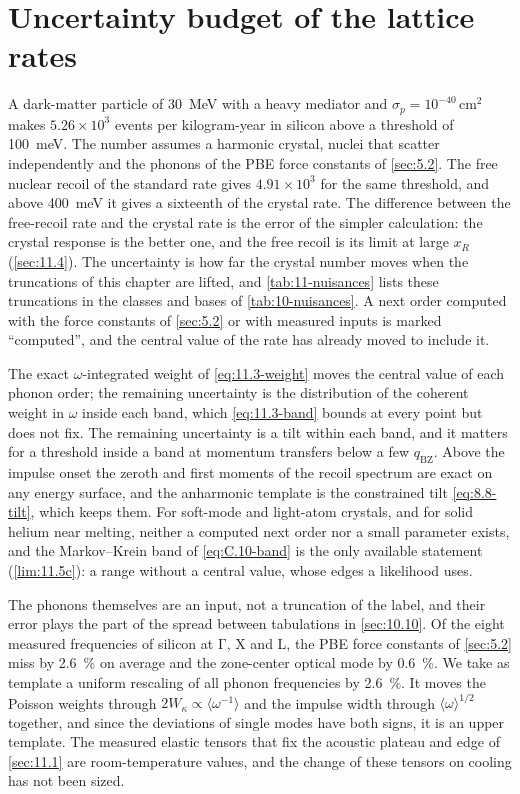 \section{Uncertainty budget of the lattice rates}\label{sec:11.9}

A dark-matter particle of \SI{30}{MeV} with a heavy mediator and $\sigma_p = 10^{-40}\,\mathrm{cm^2}$ makes $5.26\times10^3$ events per kilogram-year in silicon above a threshold of \SI{100}{meV}. The number assumes a harmonic crystal, nuclei that scatter independently and the phonons of the PBE force constants of \cref{sec:5.2}. The free nuclear recoil of the standard rate gives $4.91\times10^3$ for the same threshold, and above \SI{400}{meV} it gives a sixteenth of the crystal rate. The difference between the free-recoil rate and the crystal rate is the error of the simpler calculation: the crystal response is the better one, and the free recoil is its limit at large $x_R$ (\cref{sec:11.4}). The uncertainty is how far the crystal number moves when the truncations of this chapter are lifted, and \cref{tab:11-nuisances} lists these truncations in the classes and bases of \cref{tab:10-nuisances}. A next order computed with the force constants of \cref{sec:5.2} or with measured inputs is marked ``computed'', and the central value of the rate has already moved to include it.

The exact $\omega$-integrated weight of \cref{eq:11.3-weight} moves the central value of each phonon order; the remaining uncertainty is the distribution of the coherent weight in $\omega$ inside each band, which \cref{eq:11.3-band} bounds at every point but does not fix. The remaining uncertainty is a tilt within each band, and it matters for a threshold inside a band at momentum transfers below a few $q_{\mathrm{BZ}}$. Above the impulse onset the zeroth and first moments of the recoil spectrum are exact on any energy surface, and the anharmonic template is the constrained tilt \cref{eq:8.8-tilt}, which keeps them. For soft-mode and light-atom crystals, and for solid helium near melting, neither a computed next order nor a small parameter exists, and the Markov--Krein band of \cref{eq:C.10-band} is the only available statement (\cref{lim:11.5c}): a range without a central value, whose edges a likelihood uses.

The phonons themselves are an input, not a truncation of the label, and their error plays the part of the spread between tabulations in \cref{sec:10.10}. Of the eight measured frequencies of silicon at $\mathrm{\Gamma}$, X and L, the PBE force constants of \cref{sec:5.2} miss by \SI{2.6}{\percent} on average and the zone-center optical mode by \SI{0.6}{\percent}. We take as template a uniform rescaling of all phonon frequencies by \SI{2.6}{\percent}. It moves the Poisson weights through $2W_\kappa \propto \langle\omega^{-1}\rangle$ and the impulse width through $\langle\omega\rangle^{1/2}$ together, and since the deviations of single modes have both signs, it is an upper template. The measured elastic tensors that fix the acoustic plateau and edge of \cref{sec:11.1} are room-temperature values, and the change of these tensors on cooling has not been sized.

